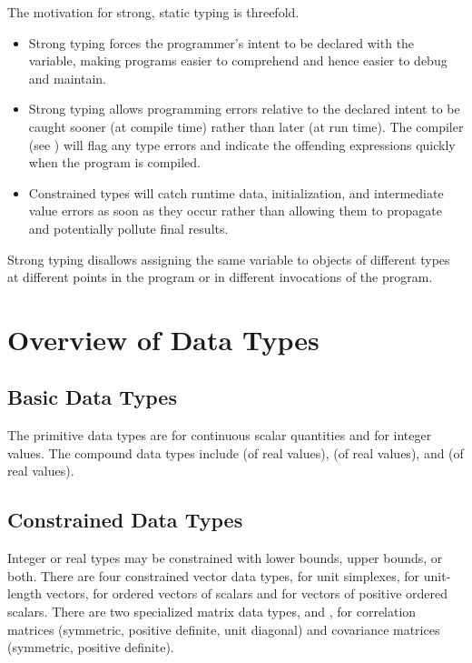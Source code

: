 The motivation for strong, static typing is threefold.  
%
\begin{itemize}
\item Strong typing forces the programmer's intent to be declared with
  the variable, making programs easier to comprehend and hence easier
  to debug and maintain.
\item Strong typing allows programming errors relative to the
  declared intent to be caught sooner (at compile time) rather than
  later (at run time).  The \Stan compiler (see )
  will flag any type errors and indicate the offending expressions
  quickly when the program is compiled.
\item Constrained types will catch runtime data, initialization, and
  intermediate value errors as soon as they occur rather than allowing
  them to propagate and potentially pollute final results.
\end{itemize}
%
Strong typing disallows assigning the same variable to objects of
different types at different points in the program or in different
invocations of the program.

\section{Overview of Data Types}

\subsection{Basic Data Types}

The primitive \Stan data types are  for continuous scalar
quantities and  for integer values.  The compound data
types include  (of real values),  (of
real values), and  (of real values).

\subsection{Constrained Data Types}

Integer or real types may be constrained with lower bounds, upper
bounds, or both.  There are four constrained vector data types,
 for unit simplexes,  for unit-length
vectors,  for ordered vectors of scalars and
 for vectors of positive ordered scalars.
There are two specialized matrix data types,
 and , for correlation matrices
(symmetric, positive definite, unit diagonal) and covariance matrices
(symmetric, positive definite).

